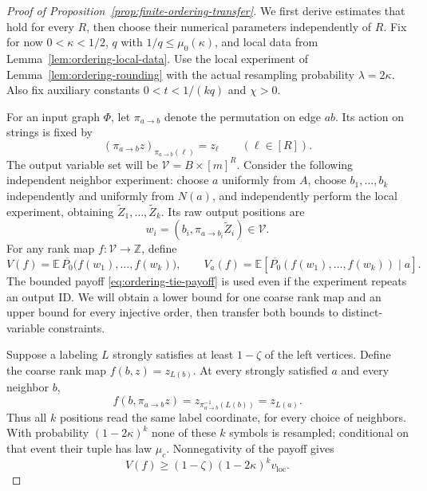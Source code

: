 \begin{proof}[Proof of Proposition~\ref{prop:finite-ordering-transfer}]
We first derive estimates that hold for every \(R\), then choose their
numerical parameters independently of \(R\).  Fix for now
\(0<\kappa<1/2\), \(q\) with \(1/q\le\mu_0(\kappa)\), and local data
from Lemma~\ref{lem:ordering-local-data}.  Use the local experiment of
Lemma~\ref{lem:ordering-rounding} with the actual resampling probability
\(\lambda=2\kappa\).  Also fix auxiliary constants
\(0<t<1/(kq)\) and \(\chi>0\).

For an input graph \(\Phi\), let \(\pi_{a\to b}\) denote the permutation
on edge \(ab\).  Its action on strings is fixed by
\[
 (\pi_{a\to b}z)_{\pi_{a\to b}(\ell)}=z_\ell
 \qquad(\ell\in[R]).
\]
The output variable set will be
\(\mathcal V=B\times[m]^R\).  Consider the following independent
neighbor experiment: choose \(a\) uniformly from \(A\), choose
\(b_1,\ldots,b_k\) independently and uniformly from \(N(a)\), and
independently perform the local experiment, obtaining
\(\widetilde Z_1,\ldots,\widetilde Z_k\).  Its raw output positions are
\begin{equation}
 w_i=(b_i,\pi_{a\to b_i}\widetilde Z_i)\in\mathcal V.
\label{eq:ordering-iid-queries}
\end{equation}
For any rank map \(f:\mathcal V\to\mathbb Z\), define
\[
 V(f)=\mathbb E\,
   \overline{P_0}\bigl(f(w_1),\ldots,f(w_k)\bigr),
 \qquad V_a(f)=\mathbb E[
   \overline{P_0}(f(w_1),\ldots,f(w_k))\mid a].
\]
The bounded payoff \eqref{eq:ordering-tie-payoff} is used even if the
experiment repeats an output ID.  We will obtain a lower bound for one
coarse rank map and an upper bound for every injective order, then
transfer both bounds to distinct-variable constraints.

Suppose a labeling \(L\) strongly satisfies at least \(1-\zeta\) of
the left vertices.  Define the coarse rank map
\(f(b,z)=z_{L(b)}\).  At every strongly satisfied \(a\) and every
neighbor \(b\),
\[
 f(b,\pi_{a\to b}z)=z_{\pi_{a\to b}^{-1}(L(b))}=z_{L(a)}.
\]
Thus all \(k\) positions read the same label coordinate, for every
choice of neighbors.  With probability \((1-2\kappa)^k\) none of
these \(k\) symbols is resampled; conditional on that event their
tuple has law \(\mu_c\).  Nonnegativity of the payoff gives
\begin{equation}
 V(f)\ge (1-\zeta)(1-2\kappa)^k v_{\mathrm{loc}}.
\label{eq:ordering-iid-completeness}
\end{equation}


\end{proof}
